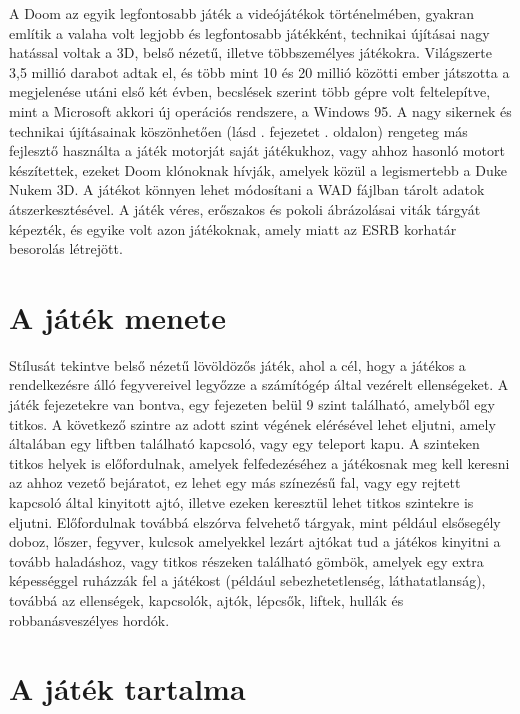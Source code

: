 \documentclass{thesis-ekf}
\theoremstyle{definition}
\begin{document}
A Doom az egyik legfontosabb játék a videójátékok történelmében, gyakran említik
a valaha volt legjobb és legfontosabb játékként, technikai újításai nagy
hatással voltak a 3D, belső nézetű, illetve többszemélyes játékokra. Világszerte
3,5 millió darabot adtak el, és több mint 10 és 20 millió közötti ember
játszotta a megjelenése utáni első két évben, becslések szerint több gépre volt
feltelepítve, mint a Microsoft akkori új operációs rendszere, a Windows 95. A
nagy sikernek és technikai újításainak köszönhetően (lásd .
fejezetet . oldalon) rengeteg más fejlesztő használta a
játék motorját saját játékukhoz, vagy ahhoz hasonló motort készítettek, ezeket
Doom klónoknak hívják, amelyek közül a legismertebb a Duke Nukem 3D. A játékot
könnyen lehet módosítani a WAD fájlban tárolt adatok átszerkesztésével. A játék
véres, erőszakos és pokoli ábrázolásai viták tárgyát képezték, és egyike volt
azon játékoknak, amely miatt az ESRB korhatár besorolás létrejött.
\cite[Bevezető]{doomgame}

\section{A játék menete}

Stílusát tekintve belső nézetű lövöldözős játék, ahol a cél, hogy a játékos a
rendelkezésre álló fegyvereivel legyőzze a számítógép által vezérelt
ellenségeket. A játék fejezetekre van bontva, egy fejezeten belül 9 szint
található, amelyből egy titkos. A következő szintre az adott szint végének
elérésével lehet eljutni, amely általában egy liftben található kapcsoló, vagy
egy teleport kapu. A szinteken titkos helyek is előfordulnak, amelyek
felfedezéséhez a játékosnak meg kell keresni az ahhoz vezető bejáratot, ez lehet
egy más színezésű fal, vagy egy rejtett kapcsoló által kinyitott ajtó, illetve
ezeken keresztül lehet titkos szintekre is eljutni. Előfordulnak továbbá
elszórva felvehető tárgyak, mint például elsősegély doboz, lőszer, fegyver,
kulcsok amelyekkel lezárt ajtókat tud a játékos kinyitni a tovább haladáshoz,
vagy titkos részeken található gömbök, amelyek egy extra képességgel ruházzák
fel a játékost (például sebezhetetlenség, láthatatlanság), továbbá az
ellenségek, kapcsolók, ajtók, lépcsők, liftek, hullák és robbanásveszélyes
hordók. \cite[Játékmenet]{doomgame}

\section{A játék tartalma}
\end{document}
